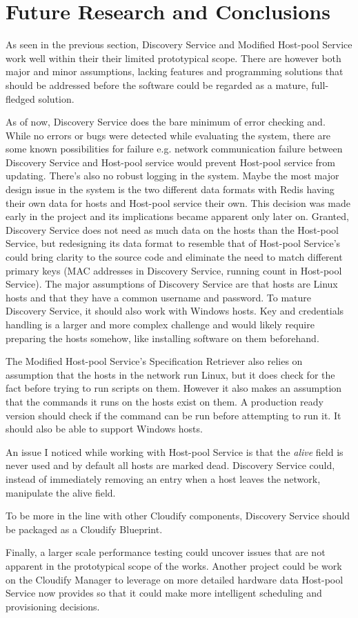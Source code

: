 \section{Future Research and Conclusions} \label{future}

As seen in the previous section, Discovery Service and Modified Host-pool Service work well within their their limited prototypical scope. There are however both major and minor assumptions, lacking features and programming solutions that should be addressed before the software could be regarded as a mature, full-fledged solution.

As of now, Discovery Service does the bare minimum of error checking and. While no errors or bugs were detected while evaluating the system, there are some known possibilities for failure e.g. network communication failure between Discovery Service and Host-pool service would prevent Host-pool service from updating. There's also no robust logging in the system.
Maybe the most major design issue in the system is the two different data formats with Redis having their own data for hosts and Host-pool service their own. This decision was made early in the project and its implications became apparent only later on. Granted, Discovery Service does not need as much data on the hosts than the Host-pool Service, but redesigning its data format to resemble that of Host-pool Service's could bring clarity to the source code and eliminate the need to match different primary keys (MAC addresses in Discovery Service, running count in Host-pool Service).
The major assumptions of Discovery Service are that hosts are Linux hosts and that they have a common username and password. To mature Discovery Service, it should also work with Windows hosts. Key and credentials handling is a larger and more complex challenge and would likely require preparing the hosts somehow, like installing software on them beforehand.

The Modified Host-pool Service's Specification Retriever also relies on assumption that the hosts in the network run Linux, but it does check for the fact before trying to run scripts on them. However it also makes an assumption that the commands it runs on the hosts exist on them. A production ready version should check if the command can be run before attempting to run it. It should also be able to support Windows hosts.

An issue I noticed while working with Host-pool Service is that the \textit{alive} field is never used and by default all hosts are marked dead. Discovery Service could, instead of immediately removing an entry when a host leaves the network, manipulate the alive field.

To be more in the line with other Cloudify components, Discovery Service should be packaged as a Cloudify Blueprint. 

Finally, a larger scale performance testing could uncover issues that are not apparent in the prototypical scope of the works. Another project could be work on the Cloudify Manager to leverage on more detailed hardware data Host-pool Service now provides so that it could make more intelligent scheduling and provisioning decisions.
